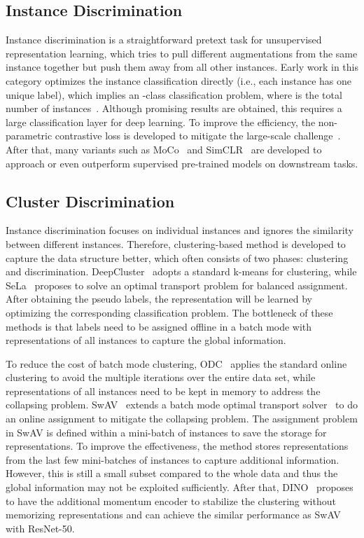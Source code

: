 \documentclass[10pt,twocolumn,letterpaper]{article}
\begin{document}
\subsection{Instance Discrimination}
Instance discrimination is a straightforward pretext task for unsupervised representation learning, which tries to pull different augmentations from the same instance together but push them away from all other instances. Early work in this category optimizes the instance classification directly (i.e., each instance has one unique label), which implies an -class classification problem, where  is the total number of instances~\cite{DosovitskiyFSRB16}. Although promising results are obtained, this requires a large classification layer for deep learning. To improve the efficiency, the non-parametric contrastive loss is developed to mitigate the large-scale challenge~\cite{WuXYL18}. After that, many variants such as MoCo~\cite{He0WXG20,abs-2003-04297,abs-2104-02057} and SimCLR~\cite{ChenK0H20} are developed to approach or even outperform supervised pre-trained models on downstream tasks.

\subsection{Cluster Discrimination}
Instance discrimination focuses on individual instances and ignores the similarity between different instances. Therefore, clustering-based method is developed to capture the data structure better, which often consists of two phases: clustering and discrimination. DeepCluster~\cite{CaronBJD18} adopts a standard k-means for clustering, while SeLa~\cite{AsanoRV20a} proposes to solve an optimal transport problem for balanced assignment. After obtaining the pseudo labels, the representation will be learned by optimizing the corresponding classification problem. The bottleneck of these methods is that labels need to be assigned offline in a batch mode with representations of all instances to capture the global information. 

To reduce the cost of batch mode clustering, ODC~\cite{ZhanX0OL20} applies the standard online clustering to avoid the multiple iterations over the entire data set, while representations of all instances need to be kept in memory to address the collapsing problem. SwAV~\cite{CaronMMGBJ20} extends a batch mode optimal transport solver~\cite{AsanoRV20a} to do an online assignment to mitigate the collapsing problem. The assignment problem in SwAV is defined within a mini-batch of instances to save the storage for representations. To improve the effectiveness, the method stores representations from the last few mini-batches of instances to capture additional information. However, this is still a small subset compared to the whole data and thus the global information may not be exploited sufficiently. After that, DINO~\cite{abs-2104-14294} proposes to have the additional momentum encoder to stabilize the clustering without memorizing representations and can achieve the similar performance as SwAV with ResNet-50. 
\end{document}
